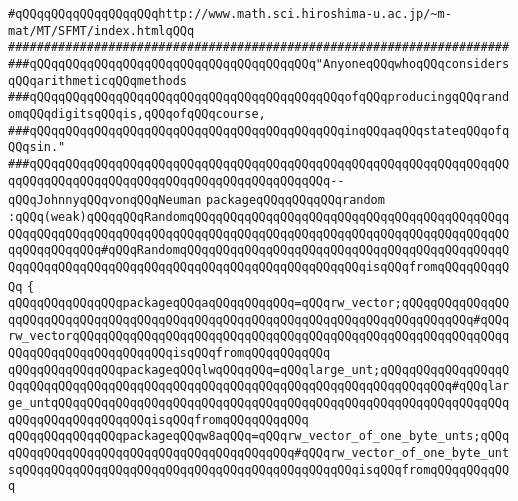\verb|#qQQqqQQqqQQqqQQqqQQqhttp://www.math.sci.hiroshima-u.ac.jp/~m-mat/MT/SFMT/index.htmlqQQq|\newline
\verb|######################################################################|\newline
\newline
\newline
\newline
\verb|###qQQqqQQqqQQqqQQqqQQqqQQqqQQqqQQqqQQqqQQq"AnyoneqQQqwhoqQQqconsidersqQQqarithmeticqQQqmethods|\newline
\verb|###qQQqqQQqqQQqqQQqqQQqqQQqqQQqqQQqqQQqqQQqqQQqofqQQqproducingqQQqrandomqQQqdigitsqQQqis,qQQqofqQQqcourse,|\newline
\verb|###qQQqqQQqqQQqqQQqqQQqqQQqqQQqqQQqqQQqqQQqqQQqinqQQqaqQQqstateqQQqofqQQqsin."|\newline
\verb|###qQQqqQQqqQQqqQQqqQQqqQQqqQQqqQQqqQQqqQQqqQQqqQQqqQQqqQQqqQQqqQQqqQQqqQQqqQQqqQQqqQQqqQQqqQQqqQQqqQQqqQQqqQQqqQQq--qQQqJohnnyqQQqvonqQQqNeuman|\newline
\newline
\newline
\newline
\verb|packageqQQqqQQqqQQqrandom|\newline
\verb|:qQQq(weak)qQQqqQQqRandomqQQqqQQqqQQqqQQqqQQqqQQqqQQqqQQqqQQqqQQqqQQqqQQqqQQqqQQqqQQqqQQqqQQqqQQqqQQqqQQqqQQqqQQqqQQqqQQqqQQqqQQqqQQqqQQqqQQqqQQqqQQqqQQq#qQQqRandomqQQqqQQqqQQqqQQqqQQqqQQqqQQqqQQqqQQqqQQqqQQqqQQqqQQqqQQqqQQqqQQqqQQqqQQqqQQqqQQqqQQqqQQqqQQqqQQqisqQQqfromqQQqqQQqqQQq|\newline
\verb|{|\newline
\verb|qQQqqQQqqQQqqQQqpackageqQQqaqQQqqQQqqQQq=qQQqrw_vector;qQQqqQQqqQQqqQQqqQQqqQQqqQQqqQQqqQQqqQQqqQQqqQQqqQQqqQQqqQQqqQQqqQQqqQQqqQQqqQQq#qQQqrw_vectorqQQqqQQqqQQqqQQqqQQqqQQqqQQqqQQqqQQqqQQqqQQqqQQqqQQqqQQqqQQqqQQqqQQqqQQqqQQqqQQqqQQqisqQQqfromqQQqqQQqqQQq|\newline
\verb|qQQqqQQqqQQqqQQqpackageqQQqlwqQQqqQQq=qQQqlarge_unt;qQQqqQQqqQQqqQQqqQQqqQQqqQQqqQQqqQQqqQQqqQQqqQQqqQQqqQQqqQQqqQQqqQQqqQQqqQQqqQQq#qQQqlarge_untqQQqqQQqqQQqqQQqqQQqqQQqqQQqqQQqqQQqqQQqqQQqqQQqqQQqqQQqqQQqqQQqqQQqqQQqqQQqqQQqqQQqisqQQqfromqQQqqQQqqQQq|\newline
\verb|qQQqqQQqqQQqqQQqpackageqQQqw8aqQQq=qQQqrw_vector_of_one_byte_unts;qQQqqQQqqQQqqQQqqQQqqQQqqQQqqQQqqQQqqQQqqQQq#qQQqrw_vector_of_one_byte_untsqQQqqQQqqQQqqQQqqQQqqQQqqQQqqQQqqQQqqQQqqQQqqQQqisqQQqfromqQQqqQQqqQQq|\newline
